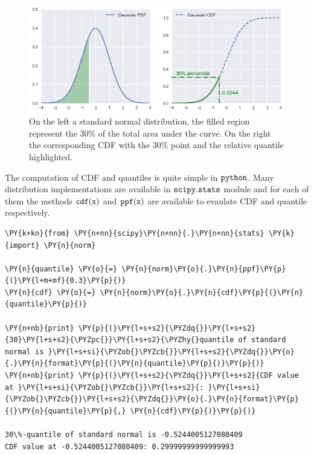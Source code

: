 \begin{figure}[htb]
  \centering
  \includegraphics[width=1.\textwidth]{percentile.png}
  \caption{On the left a standard normal distribution, the filled region represent the 30\% of the total area
  under the curve. On the right the corresponding CDF with the 30\% point and the relative quantile highlighted.}
  \label{fig:percentile}
\end{figure}

The computation of CDF and quantiles is quite simple in \(\tt{python}\).
Many distribution implementations are available in \(\tt{scipy.stats}\)
module and for each of them the methods \(\tt{cdf(x)}\) and
\(\tt{ppf(x)}\) are available to evaulate CDF and quantile respectively.

\begin{tcolorbox}[breakable, size=fbox, boxrule=1pt, pad at break*=1mm,colback=cellbackground, colframe=cellborder]
\begin{Verbatim}[commandchars=\\\{\}]
\PY{k+kn}{from} \PY{n+nn}{scipy}\PY{n+nn}{.}\PY{n+nn}{stats} \PY{k}{import} \PY{n}{norm}

\PY{n}{quantile} \PY{o}{=} \PY{n}{norm}\PY{o}{.}\PY{n}{ppf}\PY{p}{(}\PY{l+m+mf}{0.3}\PY{p}{)}
\PY{n}{cdf} \PY{o}{=} \PY{n}{norm}\PY{o}{.}\PY{n}{cdf}\PY{p}{(}\PY{n}{quantile}\PY{p}{)}

\PY{n+nb}{print} \PY{p}{(}\PY{l+s+s2}{\PYZdq{}}\PY{l+s+s2}{30}\PY{l+s+s2}{\PYZpc{}}\PY{l+s+s2}{\PYZhy{}quantile of standard normal is }\PY{l+s+si}{\PYZob{}\PYZcb{}}\PY{l+s+s2}{\PYZdq{}}\PY{o}{.}\PY{n}{format}\PY{p}{(}\PY{n}{quantile}\PY{p}{)}\PY{p}{)}
\PY{n+nb}{print} \PY{p}{(}\PY{l+s+s2}{\PYZdq{}}\PY{l+s+s2}{CDF value at }\PY{l+s+si}{\PYZob{}\PYZcb{}}\PY{l+s+s2}{: }\PY{l+s+si}{\PYZob{}\PYZcb{}}\PY{l+s+s2}{\PYZdq{}}\PY{o}{.}\PY{n}{format}\PY{p}{(}\PY{n}{quantile}\PY{p}{,} \PY{n}{cdf}\PY{p}{)}\PY{p}{)}

30\%-quantile of standard normal is -0.5244005127080409
CDF value at -0.5244005127080409: 0.29999999999999993
    \end{Verbatim}
\end{tcolorbox}

